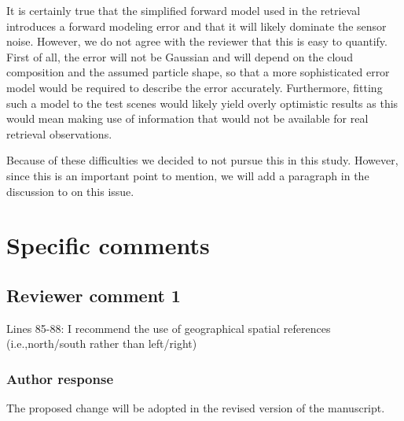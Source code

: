 \documentclass[11pt]{scrartcl}
\providecommand{\DIFadd}[1]{{\protect\textcolor{blue}{\uwave{#1}}}} %
\providecommand{\DIFdel}[1]{{\protect\textcolor{red}{\sout{#1}}}}                      %
\providecommand{\DIFaddbegin}{} %
\providecommand{\DIFaddend}{} %
\providecommand{\DIFdelbegin}{} %
\providecommand{\DIFdelend}{} %
\newenvironment{change}[1][]{%
  \begin{mdframed}[frametitle={Line #1:}]%
}{%
  \end{mdframed}%
}
\begin{document}
It is certainly true that the simplified forward model used in the retrieval
introduces a forward modeling error and that it will likely dominate the sensor
noise. However, we do not agree with the reviewer that this is easy to quantify.
First of all, the error will not be Gaussian and will depend on the cloud
composition and the assumed particle shape, so that a more sophisticated error
model would be required to describe the error accurately. Furthermore, fitting
such a model to the test scenes would likely yield overly optimistic results as
this would mean making use of information that would not be available for real
retrieval observations.

Because of these difficulties we decided to not pursue this in this study.
However, since this is an important point to mention, we will add a paragraph
in the discussion to on this issue.

%


\section{Specific comments}

\subsection*{Reviewer comment 1}
Lines 85-88: I recommend the use of geographical spatial references
(i.e.,north/south rather than left/right)

\subsubsection*{Author response}

The proposed change will be adopted in the revised version of the manuscript.

%
\end{document}
